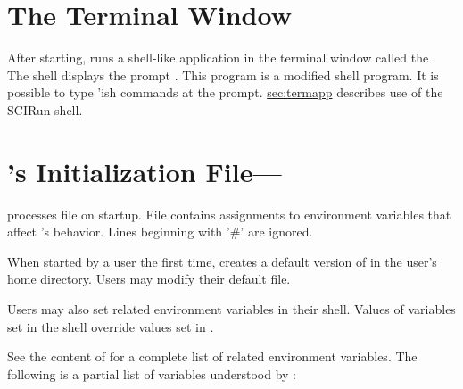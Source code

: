 \section{The Terminal Window}
\label{sec:termwinapp}

After starting, \sr{} runs a shell-like application in the
terminal window called the .  The \sr{} shell displays the
prompt .  This program is  a modified  shell program. It is possible to type
'ish \sr{} commands at the prompt.  \hyperref{A later
  section}{Section~}{}{sec:termapp} describes use of the SCIRun shell.


\section{\sr{}'s Initialization File---}
\label{sec:scirunrc}

\sr{} processes  file on startup.  File
 contains assignments to environment variables
that affect \sr{}'s behavior.  Lines beginning with '\#' are ignored.

When started by a user the first time, \sr{} creates a default version of
 in the user's home directory.  Users may modify
their default  file.

Users may also set \sr{} related environment variables in their
shell.  Values of variables set in the shell override values set in
.

See the content of  for a complete list of \sr{}
related environment variables.  The following
is a partial list of variables understood by \sr{}:

\newcommand{\envitem}[1]{\item[\envvar{#1}]\latex{\mbox{}\\}}


